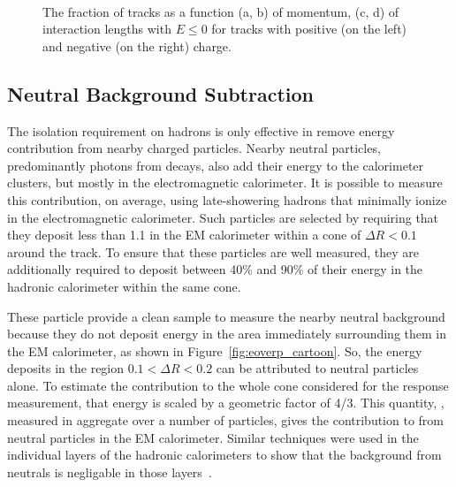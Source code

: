 \begin{figure}[htbp]
{}
~
\caption{The fraction of tracks as a function (a, b) of momentum, (c, d) of interaction lengths with $E \leq 0$ for tracks with positive (on the left) and negative (on the right) charge.}
\label{fig:zerofracincl}
\end{figure}


\subsection{Neutral Background Subtraction}
\label{sec:neutral_bg}

The isolation requirement on hadrons is only effective in remove energy contribution from nearby charged particles. 
Nearby neutral particles, predominantly photons from \piz decays, also add their energy to the calorimeter clusters, but mostly in the electromagnetic calorimeter. 
It is possible to measure this contribution, on average, using late-showering hadrons that minimally ionize in the electromagnetic calorimeter. 
Such particles are selected by requiring that they deposit less than 1.1 \GeV in the EM calorimeter within a cone of $\Delta R < 0.1$ around the track. 
To ensure that these particles are well measured, they are additionally required to deposit between 40\% and 90\% of their energy in the hadronic calorimeter within the same cone. 

These particle provide a clean sample to measure the nearby neutral background because they do not deposit energy in the area immediately surrounding them in the EM calorimeter, as shown in Figure~\ref{fig:eoverp_cartoon}.
So, the energy deposits in the region $0.1 < \Delta R < 0.2$ can be attributed to neutral particles alone.
To estimate the contribution to the whole cone considered for the response measurement, that energy is scaled by a geometric factor of 4/3. 
This quantity, \epbg, measured in aggregate over a number of particles, gives the contribution to \epav from neutral particles in the EM calorimeter. 
Similar techniques were used in the individual layers of the hadronic calorimeters to show that the background from neutrals is negligable in those layers~\cite{PERF-2011-05}. 

